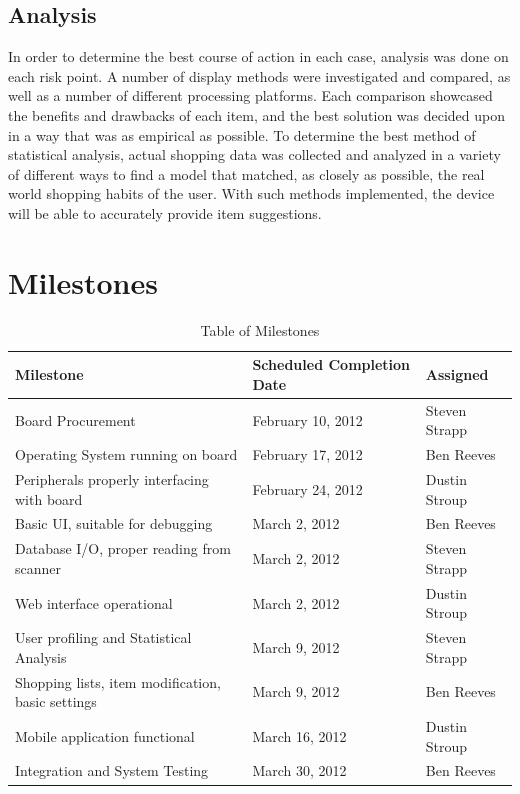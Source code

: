 \documentclass[11pt,letterpaper]{article}
\begin{document}
\subsection {Analysis}
\noindent In order to determine the best course of action in each case, analysis was done on each risk point. A number of display methods were investigated and compared, as well as a number of different processing platforms. Each comparison showcased the benefits and drawbacks of each item, and the best solution was decided upon in a way that was as empirical as possible. To determine the best method of statistical analysis, actual shopping data was collected and analyzed in a variety of different ways to find a model that matched, as closely as possible, the real world shopping habits of the user. With such methods implemented, the device will be able to accurately provide item suggestions.

\section{Milestones}
\begin{table}[h!]
\caption{Table of Milestones}
\begin{center}
\begin{tabular}{| p{6 cm} | p{4.5 cm} | p{4.5 cm}|}
\hline
\textbf{Milestone} & \textbf{Scheduled Completion Date} & \textbf{Assigned} \\
\hline
Board Procurement & February 10, 2012 & Steven Strapp\\
\hline
Operating System running on board & February 17, 2012 & Ben Reeves \\
\hline
Peripherals properly interfacing with board & February 24, 2012 & Dustin Stroup \\
\hline
Basic UI, suitable for debugging & March 2, 2012 & Ben Reeves\\
\hline
Database I/O, proper reading from scanner & March 2, 2012 & Steven Strapp \\
\hline
Web interface operational & March 2, 2012 & Dustin Stroup \\
\hline
User profiling and Statistical Analysis & March 9, 2012 & Steven Strapp \\
\hline
Shopping lists, item modification, basic settings & March 9, 2012 & Ben Reeves \\
\hline 
Mobile application functional & March 16, 2012 & Dustin Stroup \\
\hline
Integration and System Testing & March 30, 2012 & Ben Reeves \\
\hline

\end{tabular}
\label {MilestoneTable}
\end{center}
\end{table}
\end{document}
